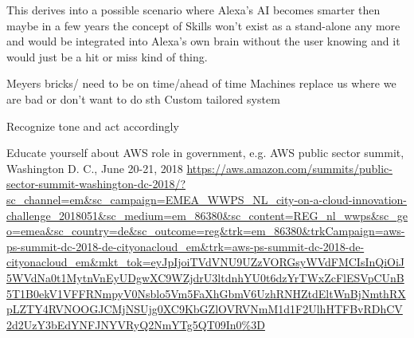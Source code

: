 




This derives into a possible scenario where Alexa's AI becomes smarter then maybe in a few years the concept of Skills won't exist as a stand-alone any more and would be integrated into Alexa's own brain without the user knowing and it would just be a hit or miss kind of thing.



Meyers bricks/ need to be on time/ahead of time
Machines replace us where we are bad or don’t want to do sth
Custom tailored system


Recognize tone and act accordingly 







Educate yourself about AWS role in government, e.g. 
AWS public sector summit, Washington D. C., June 20-21, 2018
\url{https://aws.amazon.com/summits/public-sector-summit-washington-dc-2018/?sc_channel=em&sc_campaign=EMEA_WWPS_NL_city-on-a-cloud-innovation-challenge_2018051&sc_medium=em_86380&sc_content=REG_nl_wwps&sc_geo=emea&sc_country=de&sc_outcome=reg&trk=em_86380&trkCampaign=aws-ps-summit-dc-2018-de-cityonacloud_em&trk=aws-ps-summit-dc-2018-de-cityonacloud_em&mkt_tok=eyJpIjoiTVdVNU9UZzVORGsyWVdFMCIsInQiOiJ5WVdNa0t1MytnVnEyUDgwXC9WZjdrU3ltdnhYU0t6dzYrTWxZcFlESVpCUnB5T1B0ekV1VFFRNmpyV0Nsblo5Vm5FaXhGbmV6UzhRNHZtdEltWnBjNmthRXpLZTY4RVNOOGJCMjNSUjg0XC9KbGZlOVRVNmM1d1F2UlhHTFBvRDhCV2d2UzY3bEdYNFJNYVRyQ2NmYTg5QT09In0%3D}
	
	
	
	
	
